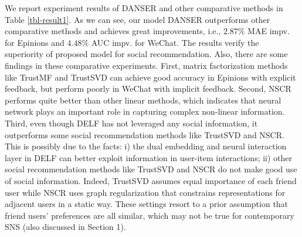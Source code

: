 \documentclass[sigconf]{acmart}
\begin{document}
We report experiment results of DANSER and other comparative methods in Table \ref{tbl-result1}. As we can see, our model DANSER outperforms other comparative methods and achieves great improvements, i.e., $2.87\%$ MAE impv. for Epinions and $4.48\%$ AUC impv. for WeChat. The results verify the superiority of proposed model for social recommendation. Also, there are some findings in these comparative experiments. First, matrix factorization methods like TrustMF and TrustSVD can achieve good accuracy in Epinions with explicit feedback, but perform poorly in WeChat with implicit feedback. Second, NSCR performs quite better than other linear methods, which indicates that neural network plays an important role in capturing complex non-linear information. Third, even though DELF has not leveraged any social information, it outperforms some social recommendation methods like TrustSVD and NSCR. This is possibly due to the facts: i) the dual embedding and neural interaction layer in DELF can better exploit information in user-item interactions; ii) other social recommendation methods like TrustSVD and NSCR do not make good use of social information. Indeed, TrustSVD assumes equal importance of each friend user while NSCR uses graph regularization that constrains representations for adjacent users in a static way. These settings resort to a prior assumption that friend users' preferences are all similar, which may not be true for contemporary SNS (also discussed in Section 1).
\end{document}
